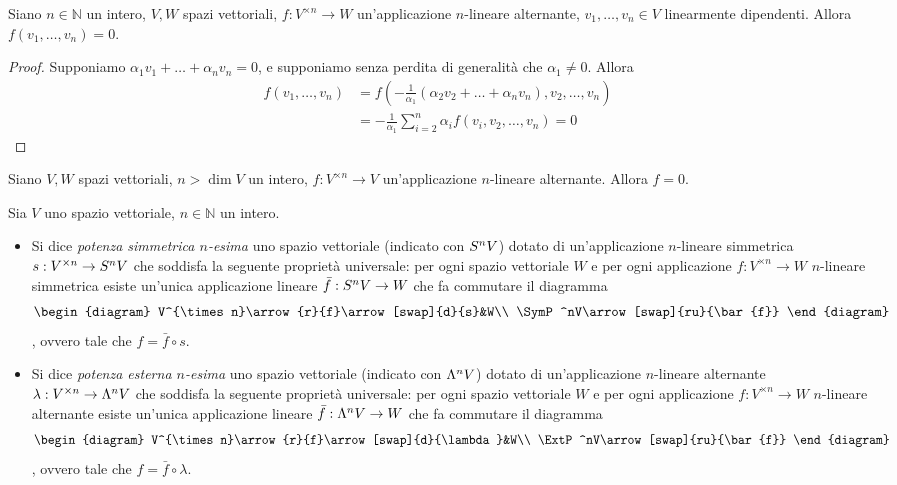 \begin{proposition}
Siano $n\in\mathbb{N}$ un intero, $V\comma W$ spazi vettoriali, $f:V^{\times n}\to W$ un'applicazione $n$-lineare alternante, $v_1,\ldots,v_n\in V$ linearmente dipendenti. Allora $f(v_1,\ldots,v_n)=0$.
\end{proposition}
\begin{proof}
Supponiamo $\alpha_1v_1+\ldots+\alpha_nv_n=0$, e supponiamo senza perdita di generalità che $\alpha_1\neq 0$. Allora
\begin{align*}
f(v_1,\ldots,v_n)&=f\left(-\frac{1}{\alpha_1}(\alpha_2v_2+\ldots+\alpha_nv_n),v_2,\ldots,v_n\right)\\
&=-\frac{1}{\alpha_1}\sum_{i=2}^{n}\alpha_if(v_i,v_2,\ldots,v_n)=0
\end{align*}
\end{proof}

\begin{corollary}
Siano $V\comma W$ spazi vettoriali, $n>\dim V$ un intero, $f:V^{\times n}\to V$ un'applicazione $n$-lineare alternante. Allora $f=0$.
\end{corollary}

\begin{definition}
Sia $V$ uno spazio vettoriale, $n\in\mathbb{N}$ un intero.
\begin{itemize}
\item Si dice \emph{potenza simmetrica $n$-esima} uno spazio vettoriale (indicato con $S^nV$) dotato di un'applicazione $n$-lineare simmetrica $s:V^{\times n}\to S^nV$ che soddisfa la seguente proprietà universale: per ogni spazio vettoriale $W$ e per ogni applicazione $f:V^{\times n}\to W$ $n$-lineare simmetrica esiste un'unica applicazione lineare $\bar{f}:S^nV\to W$ che fa commutare il diagramma
$$
\begin{diagram}
V^{\times n}\arrow{r}{f}\arrow[swap]{d}{s}&W\\
\SymP^nV\arrow[swap]{ru}{\bar{f}}
\end{diagram}
$$
, ovvero tale che $f=\bar{f}\circ s$.
\item Si dice \emph{potenza esterna $n$-esima} uno spazio vettoriale (indicato con $\Lambda^nV$) dotato di un'applicazione $n$-lineare alternante $\lambda:V^{\times n}\to\Lambda^nV$ che soddisfa la seguente proprietà universale: per ogni spazio vettoriale $W$ e per ogni applicazione $f:V^{\times n}\to W$ $n$-lineare alternante esiste un'unica applicazione lineare $\bar{f}:\Lambda^nV\to W$ che fa commutare il diagramma
$$
\begin{diagram}
V^{\times n}\arrow{r}{f}\arrow[swap]{d}{\lambda}&W\\
\ExtP^nV\arrow[swap]{ru}{\bar{f}}
\end{diagram}
$$
, ovvero tale che $f=\bar{f}\circ \lambda$.
\end{itemize}
\end{definition}

